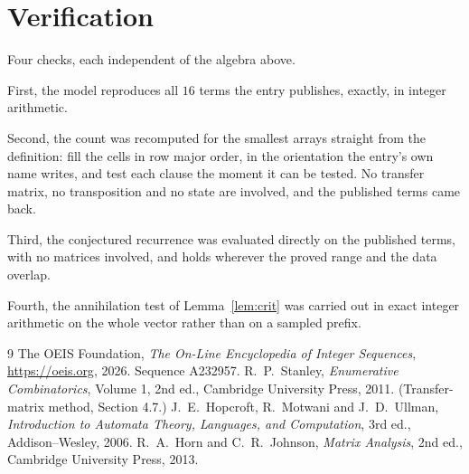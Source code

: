 \documentclass[11pt,a4paper]{article}
\theoremstyle{plain}
\theoremstyle{definition}
\begin{document}
\section{Verification}

Four checks, each independent of the algebra above.

First, the model reproduces all $16$ terms the entry publishes, exactly, in integer
arithmetic.

Second, the count was recomputed for the smallest arrays straight from the definition: fill the
cells in row major order, in the orientation the entry's own name writes, and test each clause
the moment it can be tested. No transfer matrix, no transposition and no state are involved,
and the published terms came back.

Third, the conjectured recurrence was evaluated directly on the published terms, with no
matrices involved, and holds wherever the proved range and the data overlap.

Fourth, the annihilation test of Lemma~\ref{lem:crit} was carried out in exact integer
arithmetic on the whole vector rather than on a sampled prefix.

\begin{thebibliography}{9}
 The OEIS Foundation, \emph{The On-Line Encyclopedia of Integer
Sequences}, \url{https://oeis.org}, 2026. Sequence A232957.
 R.~P.~Stanley, \emph{Enumerative Combinatorics}, Volume 1, 2nd ed.,
Cambridge University Press, 2011. (Transfer-matrix method, Section 4.7.)
 J.~E.~Hopcroft, R.~Motwani and J.~D.~Ullman, \emph{Introduction to Automata
Theory, Languages, and Computation}, 3rd ed., Addison--Wesley, 2006.
 R.~A.~Horn and C.~R.~Johnson, \emph{Matrix Analysis}, 2nd ed., Cambridge
University Press, 2013.
\end{thebibliography}
\end{document}
